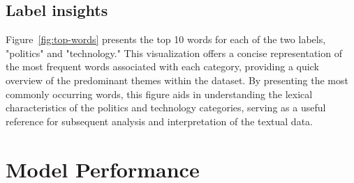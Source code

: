 \subsection{Label insights}


Figure~\ref{fig:top-words} presents the top 10 words for each of the two labels, "politics" and "technology." This visualization offers a concise representation of the most frequent words associated with each category, providing a quick overview of the predominant themes within the dataset. By presenting the most commonly occurring words, this figure aids in understanding the lexical characteristics of the politics and technology categories, serving as a useful reference for subsequent analysis and interpretation of the textual data.

\section{Model Performance}